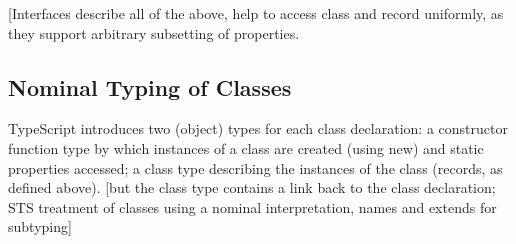 [Interfaces describe all of the above, help to access class and record uniformly, as they support arbitrary subsetting of properties.


\subsection{Nominal Typing of Classes}

TypeScript introduces two (object) types for each class declaration: a constructor function type by which instances of a class are
created (using new) and static properties accessed; a class type describing the instances of the class (records, as defined above). 
[but the class type contains a link back to the class declaration;  STS treatment of classes using a nominal interpretation, names 
and extends for subtyping]

